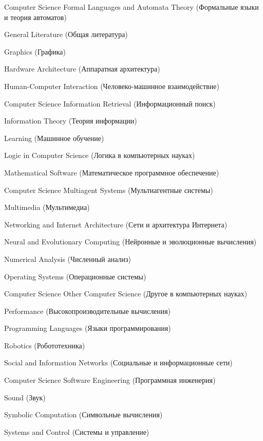 \documentclass[14pt]{beamer}
\begin{document}
\begin{frame}{Computer Science}
Formal Languages and Automata Theory (Формальные языки и теория автоматов)
 
General Literature (Общая литература)

Graphics (Графика)

Hardware Architecture (Аппаратная архитектура)

Human-Computer Interaction (Человеко-машинное взаимодействие)
\end{frame}

\begin{frame}{Computer Science}
Information Retrieval (Информационный поиск)

Information Theory (Теория информации)

Learning (Машинное обучение)

Logic in Computer Science (Логика в компьютерных науках)

Mathematical Software (Математическое программное обеспечение)
\end{frame}

\begin{frame}{Computer Science}
Multiagent Systems (Мультиагентные системы)

Multimedia (Мультимедиа)

Networking and Internet Architecture (Сети и архитектура Интернета)

Neural and Evolutionary Computing (Нейронные и эволюционные вычисления)

Numerical Analysis (Численный анализ)

Operating Systems (Операционные системы)
\end{frame}

\begin{frame}{Computer Science}
Other Computer Science (Другое в компьютерных науках)

Performance (Высокопроизводительные вычисления)

Programming Languages (Языки программирования)

Robotics (Робототехника)

Social and Information Networks (Социальные и информационные сети)
\end{frame}

\begin{frame}{Computer Science}
Software Engineering (Программная инженерия)

Sound (Звук)

Symbolic Computation (Символьные вычисления)

Systems and Control (Системы и управление)
\end{frame}
\end{document}
